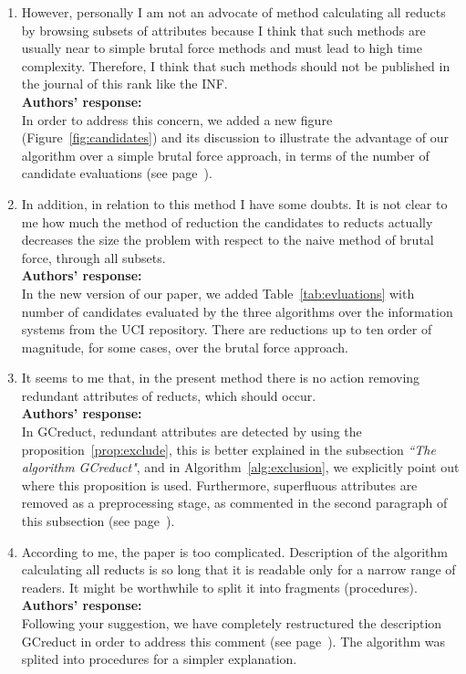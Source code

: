 \documentclass{letter}
\begin{document}
\begin{letter}{}
  \begin{enumerate}
    \item However, personally I am not  an advocate of method calculating all reducts by browsing subsets of attributes because I think that such methods are usually near to simple brutal force methods and must lead to high time complexity. Therefore, I think that such methods should not be published in the journal of this rank like the INF.\\
    \textbf{Authors’ response:} \\
    In order to address this concern, we added a new figure (Figure~\ref{fig:candidates}) and its discussion to illustrate the advantage of our algorithm over a simple brutal force approach, in terms of the number of candidate evaluations (see page~\pageref{par:brutal}).
    
    \item In addition, in relation to this method I have some doubts. It is not clear to me how much the method of reduction the candidates to reducts actually decreases the size the problem with respect to the naive method of brutal force, through all subsets.\\
    \textbf{Authors’ response:}  \\
    In the new version of our paper, we added Table~\ref{tab:evluations} with number of candidates evaluated by the three algorithms over the information systems from the UCI repository. There are reductions up to ten order of magnitude, for some cases, over the brutal force approach.

    \item It seems to me that, in the present method there is no action removing redundant attributes of reducts, which should occur.\\
    \textbf{Authors’ response:} \\
    In GCreduct, redundant attributes are detected by using the proposition~\ref{prop:exclude}, this is better explained in the subsection \textit{``The algorithm GCreduct"}, and in Algorithm~\ref{alg:exclusion}, we explicitly point out where this proposition is used. Furthermore, superfluous attributes are removed as a preprocessing stage, as commented in the second paragraph of this subsection (see page~\pageref{superfluous}).

	\item According to me, the paper is too complicated. Description of the algorithm calculating all reducts is so long that it is readable only for a narrow range of readers. It might be worthwhile to split it into fragments (procedures).\\
	\textbf{Authors’ response:} \\
	Following your suggestion, we have completely restructured the description GCreduct in order to address this comment (see page~\pageref{description}). The algorithm was splited into procedures for a simpler explanation.


\end{enumerate}
\end{letter}
\end{document}
